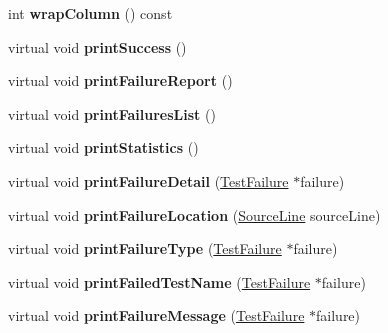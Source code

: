 \begin{DoxyCompactItemize}
\item 
\hypertarget{class_compiler_outputter_a44a670371d545db99603ce88b59aa6c0}{int {\bfseries wrap\-Column} () const }\label{class_compiler_outputter_a44a670371d545db99603ce88b59aa6c0}

\item 
\hypertarget{class_compiler_outputter_a5fb16745d10fddb67cbcbec270218589}{virtual void {\bfseries print\-Success} ()}\label{class_compiler_outputter_a5fb16745d10fddb67cbcbec270218589}

\item 
\hypertarget{class_compiler_outputter_ab277e9b8c4af074593904dbc00853561}{virtual void {\bfseries print\-Failure\-Report} ()}\label{class_compiler_outputter_ab277e9b8c4af074593904dbc00853561}

\item 
\hypertarget{class_compiler_outputter_a6919d4e1d44d03e50694aee73dc96d89}{virtual void {\bfseries print\-Failures\-List} ()}\label{class_compiler_outputter_a6919d4e1d44d03e50694aee73dc96d89}

\item 
\hypertarget{class_compiler_outputter_acc3eefc4776b975af3502ef9afaf8b3d}{virtual void {\bfseries print\-Statistics} ()}\label{class_compiler_outputter_acc3eefc4776b975af3502ef9afaf8b3d}

\item 
\hypertarget{class_compiler_outputter_a2a8fece8722cb0307a5f0f6cd0de41c3}{virtual void {\bfseries print\-Failure\-Detail} (\hyperlink{class_test_failure}{Test\-Failure} $\ast$failure)}\label{class_compiler_outputter_a2a8fece8722cb0307a5f0f6cd0de41c3}

\item 
\hypertarget{class_compiler_outputter_aac88928b23fbae0b33b1624fa5696c31}{virtual void {\bfseries print\-Failure\-Location} (\hyperlink{class_source_line}{Source\-Line} source\-Line)}\label{class_compiler_outputter_aac88928b23fbae0b33b1624fa5696c31}

\item 
\hypertarget{class_compiler_outputter_ae836af9e969ced1ebdb399313df10250}{virtual void {\bfseries print\-Failure\-Type} (\hyperlink{class_test_failure}{Test\-Failure} $\ast$failure)}\label{class_compiler_outputter_ae836af9e969ced1ebdb399313df10250}

\item 
\hypertarget{class_compiler_outputter_a3e3fc6d7f2e98161144ab02f5f42dd9b}{virtual void {\bfseries print\-Failed\-Test\-Name} (\hyperlink{class_test_failure}{Test\-Failure} $\ast$failure)}\label{class_compiler_outputter_a3e3fc6d7f2e98161144ab02f5f42dd9b}

\item 
\hypertarget{class_compiler_outputter_a701ad438ff6a5a0af01acd1d43de4b6c}{virtual void {\bfseries print\-Failure\-Message} (\hyperlink{class_test_failure}{Test\-Failure} $\ast$failure)}\label{class_compiler_outputter_a701ad438ff6a5a0af01acd1d43de4b6c}

\end{DoxyCompactItemize}
